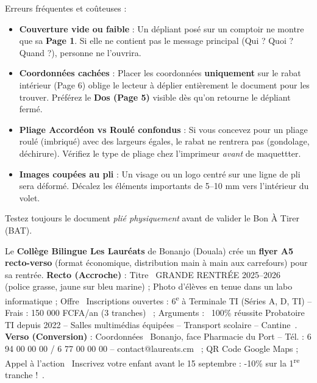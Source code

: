 \documentclass[11pt]{article}
\begin{document}
\begin{attention}
Erreurs fréquentes et coûteuses :
\begin{itemize}
\item \textbf{Couverture vide ou faible} : Un dépliant posé sur un comptoir ne montre que sa \textbf{Page 1}. Si elle ne contient pas le message principal (Qui ? Quoi ? Quand ?), personne ne l'ouvrira.
\item \textbf{Coordonnées cachées} : Placer les coordonnées \textbf{uniquement} sur le rabat intérieur (Page 6) oblige le lecteur à déplier entièrement le document pour les trouver. Préférez le \textbf{Dos (Page 5)} visible dès qu'on retourne le dépliant fermé.
\item \textbf{Pliage Accordéon vs Roulé confondus} : Si vous concevez pour un pliage roulé (imbriqué) avec des largeurs égales, le rabat ne rentrera pas (gondolage, déchirure). Vérifiez le type de pliage chez l'imprimeur \emph{avant} de maquettter.
\item \textbf{Images coupées au pli} : Un visage ou un logo centré sur une ligne de pli sera déformé. Décalez les éléments importants de 5--10 mm vers l'intérieur du volet.
\end{itemize}
Testez toujours le document \emph{plié physiquement} avant de valider le Bon À Tirer (BAT).
\end{attention}

\begin{exemplebox}
Le \textbf{Collège Bilingue Les Lauréats} de Bonanjo (Douala) crée un \textbf{flyer A5 recto-verso} (format économique, distribution main à main aux carrefours) pour sa rentrée.
\textbf{Recto (Accroche)} : Titre \og~GRANDE RENTRÉE 2025--2026~\fg{} (police grasse, jaune sur bleu marine) ; Photo d'élèves en tenue dans un labo informatique ; Offre \og~Inscriptions ouvertes : 6\textsuperscript{e} à Terminale TI (Séries A, D, TI) -- Frais : 150 000 FCFA/an (3 tranches)~\fg{} ; Arguments : \og~100\% réussite Probatoire TI depuis 2022 -- Salles multimédias équipées -- Transport scolaire -- Cantine~\fg{}.
\textbf{Verso (Conversion)} : Coordonnées \og~Bonanjo, face Pharmacie du Port -- Tél. : 6 94 00 00 00 / 6 77 00 00 00 -- contact@laureats.cm~\fg{} ; QR Code Google Maps ; Appel à l'action \og~Inscrivez votre enfant avant le 15 septembre : -10\% sur la 1\textsuperscript{re} tranche !~\fg{}.
\end{exemplebox}
\end{document}
